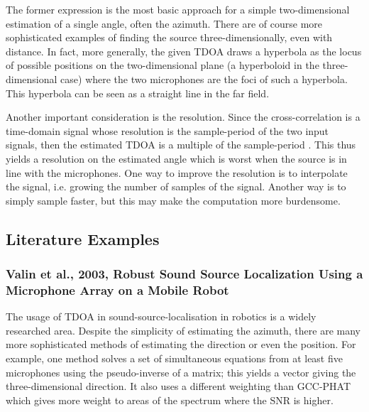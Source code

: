 \documentclass[notitlepage]{report}
\begin{document}
The former expression is the most basic approach for a simple two-dimensional estimation of a single angle, often the azimuth. There are of course more sophisticated examples of finding the source three-dimensionally, even with distance. In fact, more generally, the given TDOA draws a hyperbola as the locus of possible positions on the two-dimensional plane (a hyperboloid in the three-dimensional case) where the two microphones are the foci of such a hyperbola. This hyperbola can be seen as a straight line in the far field.

Another important consideration is the resolution. Since the cross-correlation is a time-domain signal whose resolution is the sample-period of the two input signals, then the estimated TDOA is a multiple of the sample-period \cite{argentieri_survey_2015}. This thus yields a resolution on the estimated angle which is worst when the source is in line with the microphones. One way to improve the resolution is to interpolate the signal, i.e. growing the number of samples of the signal. Another way is to simply sample faster, but this may make the computation more burdensome.

\subsection{Literature Examples}

\subsubsection{Valin et al., 2003, Robust Sound Source Localization Using a Microphone Array on a Mobile Robot}

The usage of TDOA in sound-source-localisation in robotics is a widely researched area. Despite the simplicity of estimating the azimuth, there are many more sophisticated methods of estimating the direction or even the position. For example, one method \cite{valin_robust_2003} solves a set of simultaneous equations from at least five microphones using the pseudo-inverse of a matrix; this yields a vector giving the three-dimensional direction. It also uses a different weighting than GCC-PHAT which gives more weight to areas of the spectrum where the SNR is higher. 
\end{document}
